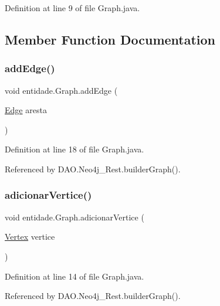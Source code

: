 Definition at line 9 of file Graph.\+java.



\subsection{Member Function Documentation}
\hypertarget{classentidade_1_1Graph_a284be62e0044149ea34122fabcdf1ace}{}\label{classentidade_1_1Graph_a284be62e0044149ea34122fabcdf1ace} 
\subsubsection{\texorpdfstring{add\+Edge()}{addEdge()}}
{\footnotesize\ttfamily void entidade.\+Graph.\+add\+Edge (\begin{DoxyParamCaption}\item[{\hyperlink{classentidade_1_1Edge}{Edge}}]{aresta }\end{DoxyParamCaption})}



Definition at line 18 of file Graph.\+java.



Referenced by D\+A\+O.\+Neo4j\+\_\+\+Rest.\+builder\+Graph().

\hypertarget{classentidade_1_1Graph_a95cb77104c1025c3628f614a299421ab}{}\label{classentidade_1_1Graph_a95cb77104c1025c3628f614a299421ab} 
\subsubsection{\texorpdfstring{adicionar\+Vertice()}{adicionarVertice()}}
{\footnotesize\ttfamily void entidade.\+Graph.\+adicionar\+Vertice (\begin{DoxyParamCaption}\item[{\hyperlink{classentidade_1_1Vertex}{Vertex}}]{vertice }\end{DoxyParamCaption})}



Definition at line 14 of file Graph.\+java.



Referenced by D\+A\+O.\+Neo4j\+\_\+\+Rest.\+builder\+Graph().

\hypertarget{classentidade_1_1Graph_a36fc05f2c89421c63f9538bf280e54bb}{}\label{classentidade_1_1Graph_a36fc05f2c89421c63f9538bf280e54bb} 
